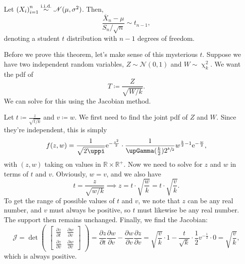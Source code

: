 \begin{theorem}
    Let \({(X_i)}_{i=1}^n \stackrel{\mathrm{i.i.d.}}{\sim} \mathscr{N}(\mu, \sigma^2)\). Then,\[
        \frac{\overline{X}_n -\mu}{S_n/\sqrt{n}}\sim t_{n-1},
    \]denoting a student \(t\) distribution with \(n-1\) degrees of freedom. 
\end{theorem}

Before we prove this theorem, let's make sense of this mysterious \(t\). 
Suppose we have two independent random variables, \(Z\sim \mathscr{N}(0,1)\) and \(W\sim \upchi_k^2\). 
We want the pdf of\[
T \coloneq \frac{Z}{\sqrt{W/k}}. 
\]We can solve for this using the Jacobian method. 

Let \(t\coloneq \frac{z}{\sqrt{t/k}}\) and \(v\coloneq w\). 
We first need to find the joint pdf of \(Z\) and \(W\). 
Since they're independent, this is simply\[
    f(z,w) = \frac{1}{\sqrt{2\uppi}} \e^{-\frac{z^2}{2}} \cdot \frac{1}{\upGamma(\frac{k}{2}) 2^{\sfrac{k}{2}}} w^{\frac{k}{2} - 1} \e^{-\frac{w}{2}}, 
\]with \((z,w)\) taking on values in \(\mathbb{R}\times\mathbb{R}^+\). 
Now we need to solve for \(z\) and \(w\) in terms of \(t\) and \(v\). 
Obviously, \(w = v\), and we also have\[
    t = \frac{z}{\sqrt{w/k}} \implies z = t\cdot \sqrt{\frac{w}{k}} = t\cdot \sqrt{\frac{v}{k}}. 
\]To get the range of possible values of \(t\) and \(v\), we note that \(z\) can be any real number, and \(v\) must always be positive, so \(t\) must likewise be any real number. 
The support then remains unchanged. 
Finally, we find the Jacobian:\[
    \mathscr{J} = \det\begin{pmatrix}
        \begin{bmatrix}
            \frac{\partial z}{\partial t} & \frac{\partial w}{\partial v} \\ 
            \frac{\partial z}{\partial v} & \frac{\partial w}{\partial v}
        \end{bmatrix}
    \end{pmatrix} = \frac{\partial z}{\partial t}\frac{\partial w}{\partial v} - \frac{\partial w}{\partial v}\frac{\partial z}{\partial v} = \sqrt{\frac{v}{k}} \cdot 1 - \frac{t}{\sqrt{k}}\cdot \frac{1}{2} v^{-\frac{1}{2}} \cdot 0 = \sqrt{\frac{v}{k}},
\]which is always positive. 
